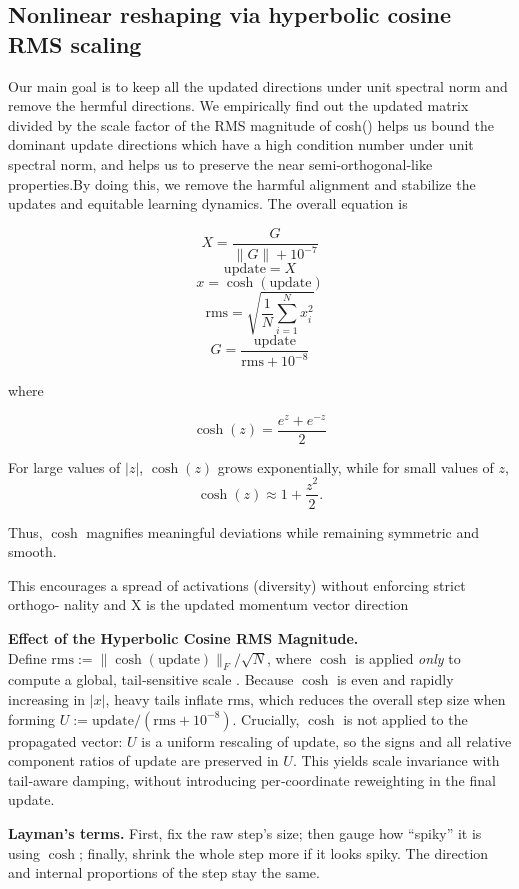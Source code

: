 \documentclass[12pt,a4paper]{article}
\begin{document}
\subsection{Nonlinear reshaping via hyperbolic cosine RMS scaling}
Our main goal is to keep all the updated directions under unit spectral norm and remove the hermful directions. We empirically find out  the updated matrix divided by the scale factor of the RMS magnitude of cosh() helps us bound the dominant update directions which have a high condition number under  unit spectral norm, and helps us to preserve the near semi-orthogonal-like properties.By doing this, we remove the harmful alignment and stabilize the updates and equitable learning dynamics. The overall equation is 


\[ X = \frac{G}{\|G\| + 10^{-7}} \] \[ \text{update} = X \] \[ x = \cosh(\text{update}) \] \[ \text{rms} = \sqrt{\frac{1}{N} \sum_{i=1}^{N} x_i^2} \] \[ G = \frac{\text{update}}{\text{rms} + 10^{-8}} \]


where

\[
\cosh(z) = \frac{e^z + e^{-z}}{2}
\]

For large values of \( |z| \), \(\cosh(z)\) grows exponentially, while for small values of \(z\),
\[
\cosh(z) \approx 1 + \frac{z^2}{2}.
\]

Thus, \(\cosh\) magnifies meaningful deviations while remaining symmetric and smooth.

This encourages a spread of activations (diversity) without enforcing strict  orthogo- \indent nality \parencite{Peletier_2023} and X is the updated momentum vector direction 

\noindent\textbf{Effect of the Hyperbolic Cosine RMS Magnitude.}\\
Define \(\mathrm{rms} := \|\cosh(\mathrm{update})\|_{F}/\sqrt{N}\), where \(\cosh\) is applied \emph{only} to compute a global, tail‑sensitive scale \parencite{article}. Because \(\cosh\) is even and rapidly increasing in \(|x|\), heavy tails inflate \(\mathrm{rms}\), which reduces the overall step size when forming \(U := \mathrm{update}/(\mathrm{rms}+10^{-8})\). Crucially, \(\cosh\) is not applied to the propagated vector: \(U\) is a uniform rescaling of \(\mathrm{update}\), so the signs and all relative component ratios of \(\mathrm{update}\) are preserved in \(U\). This yields scale invariance with tail‑aware damping, without introducing per‑coordinate reweighting in the final update.

\medskip
\noindent\textbf{Layman’s terms.}
First, fix the raw step’s size; then gauge how “spiky” it is using \(\cosh\); finally, shrink the whole step more if it looks spiky. The direction and internal proportions of the step stay the same.
\end{document}
